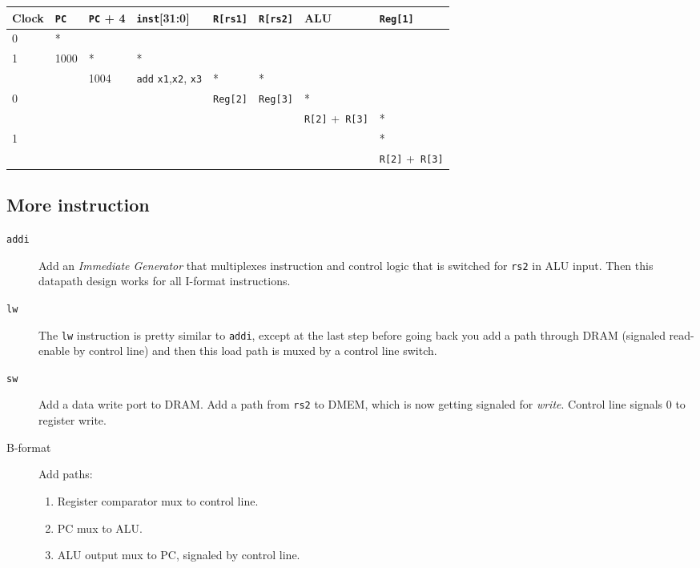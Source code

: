 \begin{tabular}{llllllll}
	Clock  & \texttt{PC} & \texttt{PC} + 4 & \texttt{inst}[31:0]                                   & \texttt{R[rs1]} & \texttt{R[rs2]} & ALU                               & \texttt{Reg[1]}                   \\ \hline
	0      & *           &  \\
	1      & 1000        & *               & *                                                     &  \\
	\ditto & \ditto      & 1004            & {}{\texttt{add} \texttt{x1},\texttt{x2}, \texttt{x3}} & *               & *               &  \\
	0      & \ditto      & \ditto          & \ditto                                                & \texttt{Reg[2]} & \texttt{Reg[3]} & *                                 &  \\
	\ditto & \ditto      & \ditto          & \ditto                                                & \ditto          & \ditto          & {}{\texttt{R[2]} +~\texttt{R[3]}} & * \\
	1      & \ditto      & \ditto          & \ditto                                                & \ditto          & \ditto          & \ditto                            & *                                 \\
	\ditto & \ditto      & \ditto          & \ditto                                                & \ditto          & \ditto          & \ditto                            & {}{\texttt{R[2]} +~\texttt{R[3]}}
\end{tabular}

\subsection{More instruction}
\begin{description}
\item [\texttt{addi}]
Add an \emph{Immediate Generator} that multiplexes instruction and control logic that is switched for \texttt{rs2} in ALU input.
Then this datapath design works for all I-format instructions.

\item[\texttt{lw}]
The \texttt{lw} instruction is pretty similar to \texttt{addi}, except at the last step before going back you add a path through DRAM (signaled read-enable by control line) and then this load path is muxed by a control line switch.

\item[\texttt{sw}]
Add a data write port to DRAM. Add a path from \texttt{rs2} to DMEM, which is now getting signaled for \emph{write}. Control line signals 0 to register write.

\item[B-format]
Add paths:
\begin{enumerate}
	\item Register comparator mux to control line.
	\item PC mux to ALU.
	\item ALU output mux to PC, signaled by control line.
\end{enumerate}
\end{description}